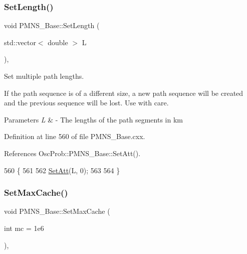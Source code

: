 \subsubsection{\texorpdfstring{Set\+Length()}{SetLength()}\hspace{0.1cm}{\footnotesize\ttfamily [2/2]}}
{\footnotesize\ttfamily void P\+M\+N\+S\+\_\+\+Base\+::\+Set\+Length (\begin{DoxyParamCaption}\item[{std\+::vector$<$ double $>$}]{L }\end{DoxyParamCaption})\hspace{0.3cm}{\ttfamily [virtual]}, {\ttfamily [inherited]}}

Set multiple path lengths.

If the path sequence is of a different size, a new path sequence will be created and the previous sequence will be lost. Use with care.


\begin{DoxyParams}{Parameters}
{\em L} & -\/ The lengths of the path segments in km \\
\hline
\end{DoxyParams}


Definition at line 560 of file P\+M\+N\+S\+\_\+\+Base.\+cxx.



References Osc\+Prob\+::\+P\+M\+N\+S\+\_\+\+Base\+::\+Set\+Att().


\begin{DoxyCode}
560                                             \{
561 
562   \hyperlink{classOscProb_1_1PMNS__Base_aba565962a440d14bee7a2a96d2eca2c5}{SetAtt}(L, 0);
563 
564 \}
\end{DoxyCode}
\mbox{\label{classOscProb_1_1PMNS__Base_ae67862cf58b0802487a14b047b012a78}} 
\subsubsection{\texorpdfstring{Set\+Max\+Cache()}{SetMaxCache()}}
{\footnotesize\ttfamily void P\+M\+N\+S\+\_\+\+Base\+::\+Set\+Max\+Cache (\begin{DoxyParamCaption}\item[{int}]{mc = {\ttfamily 1e6} }\end{DoxyParamCaption})\hspace{0.3cm}{\ttfamily [virtual]}, {\ttfamily [inherited]}}

